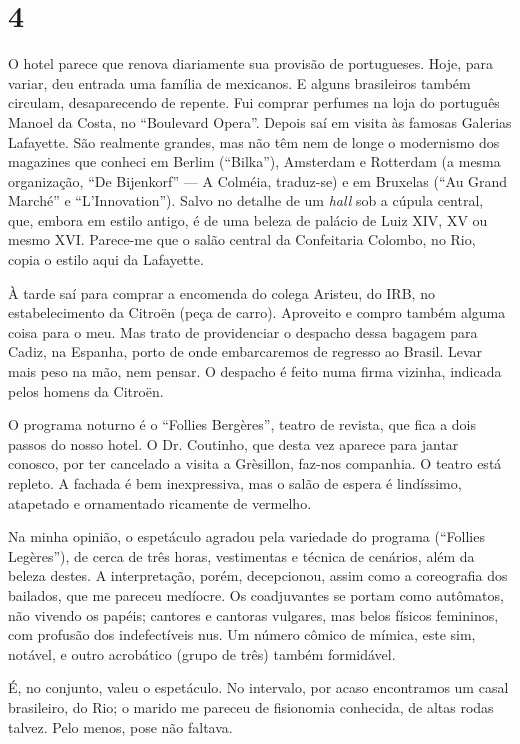 \section*{4 \adfflatleafright {}}
O hotel parece que renova diariamente sua provisão de portugueses. Hoje, para variar, deu entrada uma família de mexicanos. E alguns brasileiros também circulam, desaparecendo de repente. Fui comprar perfumes na loja do português Manoel da Costa, no ``Boulevard Opera''. Depois saí em visita às famosas Galerias Lafayette. São realmente grandes, mas não têm nem de longe o modernismo dos magazines que conheci em Berlim (``Bilka''), Amsterdam e Rotterdam (a mesma organização, ``De Bijenkorf'' --- A Colméia, traduz-se) e em Bruxelas (``Au Grand Marché'' e ``L’Innovation''). Salvo no detalhe de um \textit{hall} sob a cúpula central, que, embora em estilo antigo, é de uma beleza de palácio de Luiz XIV, XV ou mesmo XVI. Parece-me que o salão central da Confeitaria Colombo, no Rio, copia o estilo aqui da Lafayette.

À tarde saí para comprar a encomenda do colega Aristeu, do IRB, no estabelecimento da Citroën (peça de carro). Aproveito e compro também alguma coisa para o meu. Mas trato de providenciar o despacho dessa bagagem para Cadiz, na Espanha, porto de onde embarcaremos de regresso ao Brasil. Levar mais peso na mão, nem pensar. O despacho é feito numa firma vizinha, indicada pelos homens da Citroën.

O programa noturno é o ``Follies Bergères'', teatro de revista, que fica a dois passos do nosso hotel. O Dr. Coutinho, que desta vez aparece para jantar conosco, por ter cancelado a visita a Grèsillon, faz-nos companhia. O teatro está repleto. A fachada é bem inexpressiva, mas o salão de espera é lindíssimo, atapetado e ornamentado ricamente de vermelho.

Na minha opinião, o espetáculo agradou pela variedade do programa (``Follies Legères''), de cerca de três horas, vestimentas e técnica de cenários, além da beleza destes. A interpretação, porém, decepcionou, assim como a coreografia dos bailados, que me pareceu medíocre. Os coadjuvantes se portam como autômatos, não vivendo os papéis; cantores e cantoras vulgares, mas belos físicos femininos, com profusão dos indefectíveis nus. Um número cômico de mímica, este sim, notável, e outro acrobático (grupo de três) também formidável.

É, no conjunto, valeu o espetáculo. No intervalo, por acaso encontramos um casal brasileiro, do Rio; o marido me pareceu de fisionomia conhecida, de altas rodas talvez. Pelo menos, pose não faltava.

